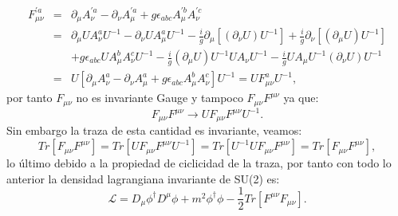 \begin{eqnarray}
\nonumber F_{\mu\nu}^{\prime a}&=&\partial_{\mu}A_{\nu}^{\prime a}-\partial_{\nu}A_{\mu}^{\prime a}+g\epsilon_{abc}A_{\mu}^{\prime b}A_{\nu}^{\prime c}\\
\nonumber &=& \partial_{\mu}UA_{\nu}^{a}U^{-1}-\partial_{\nu}UA_{\mu}^{a}U^{-1}-\frac{i}{g}\partial_{\mu}[(\partial_{\nu}U)U^{-1}]+\frac{i}{g}\partial_{\nu}[(\partial_{\mu}U)U^{-1}]\\
\nonumber && +g\epsilon_{abc}UA_{\mu}^{b}A_{\nu}^{c}U^{-1}-\frac{i}{g}(\partial_{\mu}U)U^{-1}UA_{\nu}U^{-1}-\frac{i}{g}UA_{\mu}U^{-1}(\partial_{\nu}U)U^{-1}\\
&=& U[\partial_{\mu}A_{\nu}^{a}-\partial_{\nu}A_{\mu}^{a}+g\epsilon_{abc}A_{\mu}^{b}A_{\nu}^{c}]U^{-1}=UF_{\mu\nu}^{a}U^{-1} ,
\end{eqnarray}
por tanto $F_{\mu\nu}$ no es invariante Gauge y tampoco $F_{\mu\nu}F^{\mu\nu}$ ya que:
\begin{equation}
F_{\mu\nu}F^{\mu\nu}\to UF_{\mu\nu}F^{\mu\nu} U^{-1}.
\end{equation}
Sin embargo la traza de esta cantidad es invariante, veamos:
\begin{equation}
Tr[F_{\mu\nu}F^{\mu\nu}]= Tr[UF_{\mu\nu}F^{\mu\nu} U^{-1}]=Tr[U^{-1}UF_{\mu\nu}F^{\mu\nu}]=Tr[F_{\mu\nu}F^{\mu\nu}],
\end{equation}
lo último debido a la propiedad de ciclicidad de la traza, por tanto con todo lo anterior la densidad lagrangiana invariante de SU(2) es:
\begin{equation}
\mathcal{L}=D_{\mu}\phi^{\dagger}D^{\mu}\phi+m^{2}\phi^{\dagger}\phi-\frac{1}{2}Tr[F^{\mu\nu}F_{\mu\nu}].
\end{equation}








